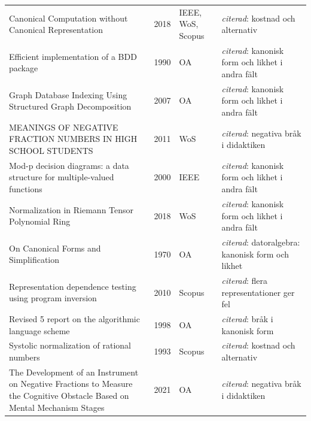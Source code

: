 \begin{longtable}{@{}%
  >{\raggedright\arraybackslash}p{}c%
  >{\raggedright\arraybackslash}p{}%
  >{\raggedright\arraybackslash}p{}@{}}
Canonical Computation without Canonical Representation & 2018 & IEEE, WoS, Scopus & \emph{citerad}: kostnad och alternativ \\
Efficient implementation of a BDD package & 1990 & OA & \emph{citerad}: kanonisk form och likhet i andra fält \\
Graph Database Indexing Using Structured Graph Decomposition & 2007 & OA & \emph{citerad}: kanonisk form och likhet i andra fält \\
MEANINGS OF NEGATIVE FRACTION NUMBERS IN HIGH SCHOOL STUDENTS & 2011 & WoS & \emph{citerad}: negativa bråk i didaktiken \\
Mod-p decision diagrams: a data structure for multiple-valued functions & 2000 & IEEE & \emph{citerad}: kanonisk form och likhet i andra fält \\
Normalization in Riemann Tensor Polynomial Ring & 2018 & WoS & \emph{citerad}: kanonisk form och likhet i andra fält \\
On Canonical Forms and Simplification & 1970 & OA & \emph{citerad}: datoralgebra: kanonisk form och likhet \\
Representation dependence testing using program inversion & 2010 & Scopus & \emph{citerad}: flera representationer ger fel \\
Revised 5 report on the algorithmic language scheme & 1998 & OA & \emph{citerad}: bråk i kanonisk form \\
Systolic normalization of rational numbers & 1993 & Scopus & \emph{citerad}: kostnad och alternativ \\
The Development of an Instrument on Negative Fractions to Measure the Cognitive Obstacle Based on Mental Mechanism Stages & 2021 & OA & \emph{citerad}: negativa bråk i didaktiken \\
\end{longtable}
\endgroup
